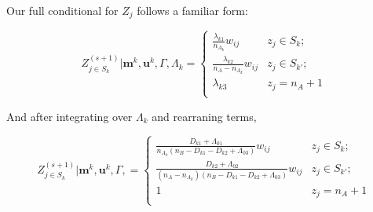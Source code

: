 \documentclass[
  12pt,
]{article}
\begin{document}
Our full conditional for \(Z_j\) follows a familiar form:

\[Z_{j \in S_k}^{(s+1)} | \mathbf{m}^k, \mathbf{u}^k, \Gamma, \Lambda_k =
\begin{cases} 
    \frac{\lambda_{k1}}{n_{A_k}} w_{ij} & z_j \in S_k; \\
    \frac{\lambda_{k2}}{n_A - n_{A_k}} w_{ij}  & z_j \in S_{k'}; \\
     \lambda_{k3} & z_j = n_A + 1 \\
\end{cases}\]

And after integrating over \(\Lambda_k\) and rearraning terms,

\[Z_{j \in S_k}^{(s+1)} | \mathbf{m}^k, \mathbf{u}^k, \Gamma,  =
\begin{cases} 
    \frac{D_{k1} + \Lambda_{01}}{n_{A_k}(n_B - D_{k1} - D_{k2} + \Lambda_{03})} w_{ij} & z_j \in S_k; \\
    \frac{D_{k2} + \Lambda_{02}}{(n_A - n_{A_k})(n_B - D_{k1} - D_{k2} + \Lambda_{03})} w_{ij}  & z_j \in S_{k'}; \\
     1 & z_j = n_A + 1 \\
\end{cases}\]
\end{document}
